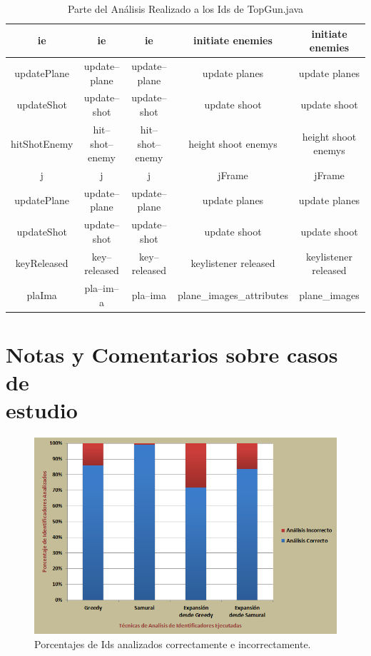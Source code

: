 \begin{table}
\begin{tabular}{| c | c | c | c | c |}
ie&ie&ie&initiate enemies&initiate enemies\\ \hline
updatePlane&update--plane&update--plane&update planes&update planes\\ \hline
updateShot&update--shot&update--shot&update shoot&update shoot\\ \hline
hitShotEnemy&hit--shot--enemy&hit--shot--enemy&height shoot enemys&height shoot enemys\\ \hline
j&j&j&jFrame&jFrame\\ \hline
updatePlane&update--plane&update--plane&update planes&update planes\\ \hline
updateShot&update--shot&update--shot&update shoot&update shoot\\ \hline
keyReleased&key--released&key--released&keylistener released&keylistener released\\ \hline
plaIma&pla--im--a&pla--ima&plane\_images\_attributes&plane\_images \\ \hline
   
   	\end{tabular}  
	 
   \caption{Parte del Análisis Realizado a los Ids de TopGun.java}
   \label{tabla7}
     
\end{table} 

\clearpage %

\section{Notas y Comentarios sobre casos de\\ estudio}

\begin{figure}[h!] %
\centerline{%
\includegraphics[scale= 0.7]{./cap4/barras_cu.png}
}
\caption{Porcentajes de Ids analizados correctamente e incorrectamente.}
\label{barras}
\end{figure}

